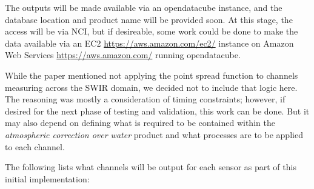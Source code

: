 \documentclass[a4paper]{article}
\begin{document}
    \begin{flushleft}
      The outputs will be made available via an opendatacube instance, and the database location and product name will be provided soon. At this stage, the access will be via NCI, but if desireable, some work could be done to make the data available via an EC2 \url{https://aws.amazon.com/ec2/} instance on Amazon Web Services \url{https://aws.amazon.com/} running opendatacube. \par
      While the paper mentioned not applying the point spread function to channels measuring across the SWIR domain, we decided not to include that logic here. The reasoning was mostly a consideration of timing constraints; however, if desired for the next phase of testing and validation, this work can be done. But it may also depend on defining what is required to be contained within the \textit{atmospheric correction over water} product and what processes are to be applied to each channel. \par

    \clearpage

      The following lists what channels will be output for each sensor as part of this initial implementation:
    \end{flushleft}
\end{document}
